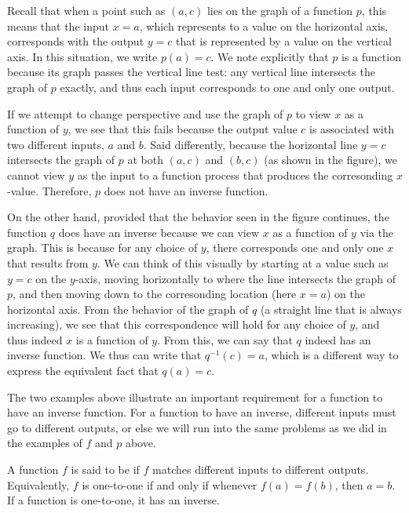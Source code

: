 \documentclass[nooutcomes]{ximera}
\begin{document}
Recall that when a point such as $(a,c)$ lies on the graph of a function $p$, this means that the input $x = a$, which represents to a value on the horizontal axis, corresponds with the output $y = c$ that is represented by a value on the vertical axis.  In this situation, we write $p(a) = c$.  We note explicitly that $p$ is a function because its graph passes the vertical line test: any vertical line intersects the graph of $p$ exactly, and thus each input corresponds to one and only one output.

If we attempt to change perspective and use the graph of $p$ to view $x$ as a function of $y$, we see that this fails because the output value $c$ is associated with two different inputs, $a$ and $b$.  Said differently, because the horizontal line $y = c$ intersects the graph of $p$ at both $(a,c)$ and $(b,c)$ (as shown in the figure), we cannot view $y$ as the input to a function process that produces the corresonding $x$-value.  Therefore, $p$ does not have an inverse function.

On the other hand, provided that the behavior seen in the figure continues, the function $q$ does have an inverse because we can view $x$ as a function of $y$ via the graph.  This is because for any choice of $y$, there corresponds one and only one $x$ that results from $y$.  We can think of this visually by starting at a value such as $y = c$ on the $y$-axis, moving horizontally to where the line intersects the graph of $p$, and then moving down to the corresonding location (here $x = a$) on the horizontal axis.  From the behavior of the graph of $q$ (a straight line that is always increasing), we see that this correspondence will hold for any choice of $y$, and thus indeed $x$ is a function of $y$.  From this, we can say that $q$ indeed has an inverse function.  We thus can write that $q^{-1}(c) = a$, which is a different way to express the equivalent fact that $q(a) = c$.

The two examples above illustrate an important requirement for a function to have an inverse function. For a function to have an inverse, different inputs must go to different outputs, or else we will run into the same problems as we did in the examples of $f$ and $p$ above.

\begin{definition}
A function $f$ is said to be   if $f$ matches different inputs to different
outputs. Equivalently, $f$ is one-to-one if and only if whenever $f(a) = f(b)$, then $a = b$. If a function is one-to-one, it has an inverse.
\end{definition}
\end{document}
